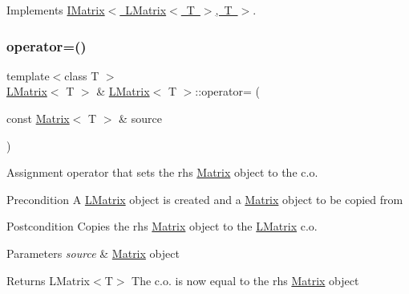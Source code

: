 Implements \mbox{\hyperlink{class_i_matrix_a9eeb68de7e1d37d1aab439c78fea9be3}{I\+Matrix$<$ L\+Matrix$<$ T $>$, T $>$}}.

\mbox{\label{class_l_matrix_a4417a98f81bcd9797241cf658b8ba400}} 
\subsubsection{\texorpdfstring{operator=()}{operator=()}\hspace{0.1cm}{\footnotesize\ttfamily [2/2]}}
{\footnotesize\ttfamily template$<$class T $>$ \\
\mbox{\hyperlink{class_l_matrix}{L\+Matrix}}$<$ T $>$ \& \mbox{\hyperlink{class_l_matrix}{L\+Matrix}}$<$ T $>$\+::operator= (\begin{DoxyParamCaption}\item[{const \mbox{\hyperlink{class_matrix}{Matrix}}$<$ T $>$ \&}]{source }\end{DoxyParamCaption})}



Assignment operator that sets the rhs \mbox{\hyperlink{class_matrix}{Matrix}} object to the c.\+o. 

\begin{DoxyPrecond}{Precondition}
A \mbox{\hyperlink{class_l_matrix}{L\+Matrix}} object is created and a \mbox{\hyperlink{class_matrix}{Matrix}} object to be copied from 
\end{DoxyPrecond}
\begin{DoxyPostcond}{Postcondition}
Copies the rhs \mbox{\hyperlink{class_matrix}{Matrix}} object to the \mbox{\hyperlink{class_l_matrix}{L\+Matrix}} c.\+o. 
\end{DoxyPostcond}

\begin{DoxyParams}{Parameters}
{\em source} & \mbox{\hyperlink{class_matrix}{Matrix}} object \\
\hline
\end{DoxyParams}
\begin{DoxyReturn}{Returns}
L\+Matrix$<$\+T$>$ The c.\+o. is now equal to the rhs \mbox{\hyperlink{class_matrix}{Matrix}} object 
\end{DoxyReturn}
\mbox{\label{class_l_matrix_a7eab2a6c57437448d21a04484844e359}} 
